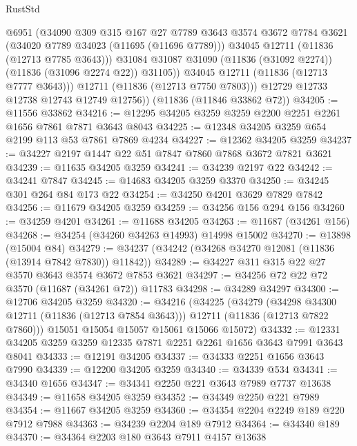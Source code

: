 \begin{lexlean}{RustStd}
\begin{coremodule}
                @6951
                (@34090
                  @309
                  @315
                  @167
                  @27
                  @7789
                  @3643
                  @3574
                  @3672
                  @7784
                  @3621
                  (@34020 @7789 @34023 (@11695 (@11696 @7789)))
                  @34045
                  @12711
                  (@11836 (@12713 @7785 @3643)))
                @31084
                @31087
                @31090
                (@11836 (@31092 @2274))
                (@11836 (@31096 @2274 @22))
                @31105))
            @34045
            @12711
            (@11836 (@12713 @7777 @3643)))
          @12711
          (@11836 (@12713 @7750 @7803)))
        @12729
        @12733
        @12738
        @12743
        @12749
        @12756))
    (@11836 (@11846 @33862 @72))
@34205 := @11556 @33862
@34216 := @12295 @34205 @3259 @3259 @2200 @2251 @2261 @1656 @7861 @7871 @3643 @8043
@34225 := @12348 @34205 @3259 @654 @2199 @113 @53 @7861 @7869 @4234
@34227 := @12362 @34205 @3259
@34237 := @34227 @2197 @1447 @22 @51 @7847 @7860 @7868 @3672 @7821 @3621
@34239 := @11635 @34205 @3259
@34241 := @34239 @2197 @22
@34242 := @34241 @7847
@34245 := @14683 @34205 @3259 @3370
@34250 := @34245 @301 @264 @84 @173 @22
@34254 := @34250 @4201 @3629 @7829 @7842
@34256 := @11679 @34205 @3259
@34259 := @34256 @156 @294 @156
@34260 := @34259 @4201
@34261 := @11688 @34205
@34263 := @11687 (@34261 @156)
@34268 := @34254 (@34260 @34263 @14993) @14998 @15002
@34270 := @13898 (@15004 @84)
@34279 := @34237 (@34242 (@34268 @34270 @12081 (@11836 (@13914 @7842 @7830)) @11842))
@34289 := @34227 @311 @315 @22 @27 @3570 @3643 @3574 @3672 @7853 @3621
@34297 := @34256 @72 @22 @72 @3570 (@11687 (@34261 @72)) @11783
@34298 := @34289 @34297
@34300 := @12706 @34205 @3259
@34320 := @34216
    (@34225
      (@34279
        (@34298 @34300 @12711 (@11836 (@12713 @7854 @3643)))
        @12711
        (@11836 (@12713 @7822 @7860)))
      @15051
      @15054
      @15057
      @15061
      @15066
      @15072)
@34332 := @12331 @34205 @3259 @3259 @12335 @7871 @2251 @2261 @1656 @3643 @7991 @3643 @8041
@34333 := @12191 @34205
@34337 := @34333 @2251 @1656 @3643 @7990
@34339 := @12200 @34205 @3259
@34340 := @34339 @534
@34341 := @34340 @1656
@34347 := @34341 @2250 @221 @3643 @7989 @7737 @13638
@34349 := @11658 @34205 @3259
@34352 := @34349 @2250 @221 @7989
@34354 := @11667 @34205 @3259
@34360 := @34354 @2204 @2249 @189 @220 @7912 @7988
@34363 := @34239 @2204 @189 @7912
@34364 := @34340 @189
@34370 := @34364 @2203 @180 @3643 @7911 @4157 @13638

\end{coremodule}
\end{lexlean}
